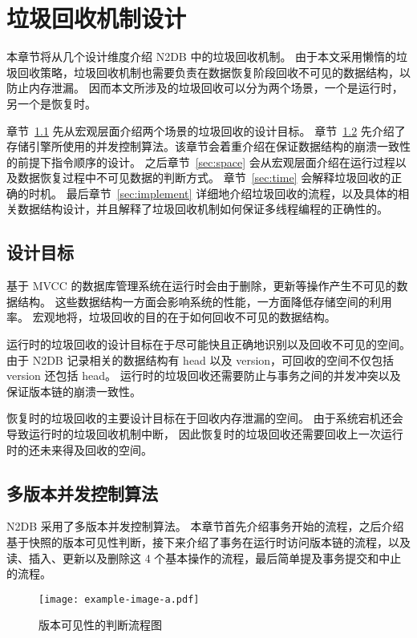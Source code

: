 
\chapter{垃圾回收机制设计}

本章节将从几个设计维度介绍 N2DB 中的垃圾回收机制。
由于本文采用懒惰的垃圾回收策略，垃圾回收机制也需要负责在数据恢复阶段回收不可见的数据结构，以防止内存泄漏。
因而本文所涉及的垃圾回收可以分为两个场景，一个是运行时，另一个是恢复时。

章节~\ref{sec:gc-goal} 先从宏观层面介绍两个场景的垃圾回收的设计目标。
章节~\ref{sec:mvcc} 先介绍了存储引擎所使用的并发控制算法。该章节会着重介绍在保证数据结构的崩溃一致性的前提下指令顺序的设计。
之后章节~\ref{sec:space} 会从宏观层面介绍在运行过程以及数据恢复过程中不可见数据的判断方式。
章节~\ref{sec:time} 会解释垃圾回收的正确的时机。
最后章节~\ref{sec:implement} 详细地介绍垃圾回收的流程，以及具体的相关数据结构设计，并且解释了垃圾回收机制如何保证多线程编程的正确性的。


\section{设计目标}
\label{sec:gc-goal}

基于 MVCC 的数据库管理系统在运行时会由于删除，更新等操作产生不可见的数据结构。
这些数据结构一方面会影响系统的性能，一方面降低存储空间的利用率。
宏观地将，垃圾回收的目的在于如何回收不可见的数据结构。

运行时的垃圾回收的设计目标在于尽可能快且正确地识别以及回收不可见的空间。
由于 N2DB 记录相关的数据结构有 head 以及 version，可回收的空间不仅包括 version 还包括 head。
运行时的垃圾回收还需要防止与事务之间的并发冲突以及保证版本链的崩溃一致性。

恢复时的垃圾回收的主要设计目标在于回收内存泄漏的空间。
由于系统宕机还会导致运行时的垃圾回收机制中断，
因此恢复时的垃圾回收还需要回收上一次运行时的还未来得及回收的空间。


\section{多版本并发控制算法}
\label{sec:mvcc}
N2DB 采用了多版本并发控制算法。
本章节首先介绍事务开始的流程，之后介绍基于快照的版本可见性判断，接下来介绍了事务在运行时访问版本链的流程，以及读、插入、更新以及删除这 4 个基本操作的流程，最后简单提及事务提交和中止的流程。

\begin{figure}[ht]
    \centering
    \texttt{[image: example-image-a.pdf]}
    \caption{版本可见性的判断流程图}
    \label{fig:version-visibility}
\end{figure}

